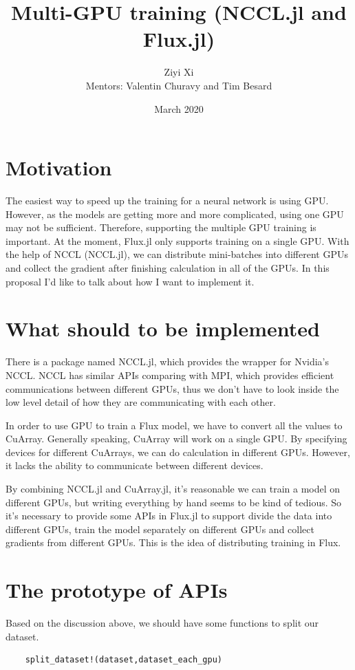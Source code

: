 \documentclass[12pt]{extarticle}
\title{Multi-GPU training (NCCL.jl and Flux.jl)}
\author{Ziyi Xi\\
Mentors: Valentin Churavy and Tim Besard}
\date{March 2020}
\begin{document}
\maketitle

\section{Motivation}
The easiest way to speed up the training for a neural network is using GPU. However, as the models
are getting more and more complicated, using one GPU may not be sufficient. Therefore, supporting the multiple
GPU training is important. At the moment, Flux.jl only supports training on a single GPU. With the help of 
NCCL (NCCL.jl), we can distribute mini-batches into different GPUs and collect the gradient after finishing calculation
in all of the GPUs. In this proposal I'd like to talk about how I want to implement it. 

\section{What should to be implemented}

There is a package named NCCL.jl, which provides the wrapper for Nvidia's NCCL. NCCL has similar APIs comparing with 
MPI, which provides efficient communications between different GPUs, thus we don't have to look inside the low level detail of
how they are communicating with each other.

In order to use GPU to train a Flux model, we have to convert all the values to CuArray. Generally speaking, CuArray will 
work on a single GPU.  By specifying devices for different CuArrays, we can do calculation in different GPUs. However, it lacks
the ability to communicate between different devices.

By combining NCCL.jl and CuArray.jl, it's reasonable we can train a model on different GPUs, but writing everything by hand seems to 
be kind of tedious. So it's necessary to provide some APIs in Flux.jl to support divide the data into different GPUs, train the model
separately on different GPUs and collect gradients from different GPUs. This is the idea of distributing training in Flux. 

\section{The prototype of APIs}

Based on the discussion above, we should have some functions to split our dataset.
\begin{verbatim}
    split_dataset!(dataset,dataset_each_gpu)
\end{verbatim}
\end{document}
